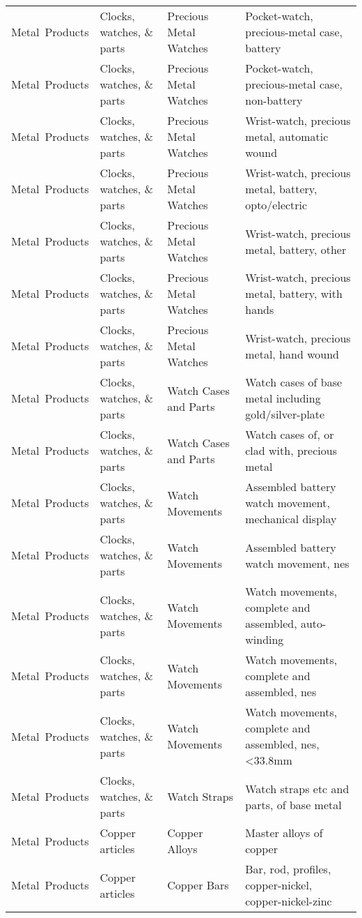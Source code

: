 \begin{appendices}
\begin{xltabular}{\textwidth}{|p{0.10\textwidth}|p{0.25\textwidth}|p{0.20\textwidth}|p{0.35\textwidth}|}
		Metal\ Products & Clocks, watches, \& parts & Precious Metal Watches & Pocket-watch, precious-metal case, battery \\
		Metal\ Products & Clocks, watches, \& parts & Precious Metal Watches & Pocket-watch, precious-metal case, non-battery \\
		Metal\ Products & Clocks, watches, \& parts & Precious Metal Watches & Wrist-watch, precious metal, automatic wound \\
		Metal\ Products & Clocks, watches, \& parts & Precious Metal Watches & Wrist-watch, precious metal, battery, opto/electric \\
		Metal\ Products & Clocks, watches, \& parts & Precious Metal Watches & Wrist-watch, precious metal, battery, other \\
		Metal\ Products & Clocks, watches, \& parts & Precious Metal Watches & Wrist-watch, precious metal, battery, with hands \\
		Metal\ Products & Clocks, watches, \& parts & Precious Metal Watches & Wrist-watch, precious metal, hand wound \\
		Metal\ Products & Clocks, watches, \& parts & Watch Cases and Parts & Watch cases of base metal including gold/silver-plate \\
		Metal\ Products & Clocks, watches, \& parts & Watch Cases and Parts & Watch cases of, or clad with, precious metal \\
		Metal\ Products & Clocks, watches, \& parts & Watch Movements & Assembled battery watch movement, mechanical display \\
		Metal\ Products & Clocks, watches, \& parts & Watch Movements & Assembled battery watch movement, nes \\
		Metal\ Products & Clocks, watches, \& parts & Watch Movements & Watch movements, complete and assembled, auto-winding \\
		Metal\ Products & Clocks, watches, \& parts & Watch Movements & Watch movements, complete and assembled, nes \\
		Metal\ Products & Clocks, watches, \& parts & Watch Movements & Watch movements, complete and assembled, nes, <33.8mm \\
		Metal\ Products & Clocks, watches, \& parts & Watch Straps & Watch straps etc and parts, of base metal \\
		Metal\ Products & Copper articles & Copper Alloys & Master alloys of copper \\
		Metal\ Products & Copper articles & Copper Bars & Bar, rod, profiles, copper-nickel, copper-nickel-zinc \\

\end{xltabular}
\end{appendices}
